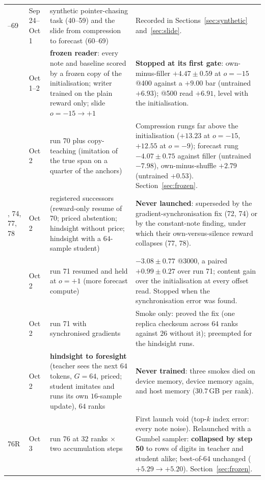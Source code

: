 \documentclass{article} %
\begin{document}
{\begin{longtable}{@{}llp{3.6cm}p{5.6cm}@{}}
\addlinespace
40--69 & Sep 24--Oct 1 & synthetic pointer-chasing task (40--59) and the slide from compression to forecast (60--69) & Recorded in Sections~\ref{sec:synthetic} and~\ref{sec:slide}. \\
\addlinespace
70 & Oct 1--2 & \textbf{frozen reader}: every note and baseline scored by a frozen copy of the initialisation; writer trained on the plain reward only; slide $o=-15 \to +1$ & \textbf{Stopped at its first gate}: own-minus-filler $+4.47 \pm 0.59$ at $o=-15$ @400 against a $+9.00$ bar (untrained $+6.93$); @500 read $+6.91$, level with the initialisation. \\
\addlinespace
71 & Oct 2 & run 70 plus copy-teaching (imitation of the true span on a quarter of the anchors) & Compression rungs far above the initialisation ($+13.23$ at $o=-15$, $+12.55$ at $o=-9$); forecast rung $-4.07 \pm 0.75$ against filler (untrained $-7.98$), own-minus-shuffle $+2.79$ (untrained $+0.53$). Section~\ref{sec:frozen}. \\
\addlinespace
72, 74, 77, 78 & Oct 2 & registered successors (reward-only resume of 70; priced abstention; hindsight without price; hindsight with a $64$-sample student) & \textbf{Never launched}: superseded by the gradient-synchronisation fix (72, 74) or by the constant-note finding, under which their own-versus-silence reward collapses (77, 78). \\
\addlinespace
73 & Oct 2 & run 71 resumed and held at $o=+1$ (more forecast compute) & $-3.08 \pm 0.77$ @3000, a paired $+0.99 \pm 0.27$ over run 71; content gain over the initialisation at every offset read. Stopped when the synchronisation error was found. \\
\addlinespace
75 & Oct 2 & run 71 with synchronised gradients & Smoke only: proved the fix (one replica checksum across $64$ ranks against $26$ without it); preempted for the hindsight runs. \\
\addlinespace
76 & Oct 2 & \textbf{hindsight to foresight} (teacher sees the next $64$ tokens, $G=64$, priced; student imitates and runs its own $16$-sample update), $64$ ranks & \textbf{Never trained}: three smokes died on device memory, device memory again, and host memory ($30.7$\,GB per rank). \\
\addlinespace
76R & Oct 3 & run 76 at $32$ ranks $\times$ two accumulation steps & First launch void (top-$k$ index error: every note noise). Relaunched with a Gumbel sampler: \textbf{collapsed by step 50} to rows of digits in teacher and student alike; best-of-$64$ unchanged ($+5.29 \to +5.20$). Section~\ref{sec:frozen}. \\

\end{longtable}}
\end{document}
